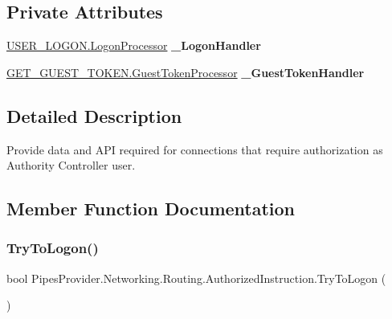 \subsection*{Private Attributes}
\begin{DoxyCompactItemize}
\item 
\mbox{\label{class_pipes_provider_1_1_networking_1_1_routing_1_1_authorized_instruction_ad4c378226e015ebdcd8390dd63d54669}} 
\mbox{\hyperlink{class_authority_controller_1_1_queries_1_1_u_s_e_r___l_o_g_o_n_1_1_logon_processor}{U\+S\+E\+R\+\_\+\+L\+O\+G\+O\+N.\+Logon\+Processor}} {\bfseries \+\_\+\+Logon\+Handler}
\item 
\mbox{\label{class_pipes_provider_1_1_networking_1_1_routing_1_1_authorized_instruction_a981488184cffd1c3f4e91e35bda055ba}} 
\mbox{\hyperlink{class_authority_controller_1_1_queries_1_1_g_e_t___g_u_e_s_t___t_o_k_e_n_1_1_guest_token_processor}{G\+E\+T\+\_\+\+G\+U\+E\+S\+T\+\_\+\+T\+O\+K\+E\+N.\+Guest\+Token\+Processor}} {\bfseries \+\_\+\+Guest\+Token\+Handler}
\end{DoxyCompactItemize}


\subsection{Detailed Description}
Provide data and A\+PI required for connections that require authorization as Authority Controller user. 



\subsection{Member Function Documentation}
\mbox{\label{class_pipes_provider_1_1_networking_1_1_routing_1_1_authorized_instruction_addf69c3fea172cc9d8199097466a052f}} 
\subsubsection{\texorpdfstring{Try\+To\+Logon()}{TryToLogon()}}
{\footnotesize\ttfamily bool Pipes\+Provider.\+Networking.\+Routing.\+Authorized\+Instruction.\+Try\+To\+Logon (\begin{DoxyParamCaption}{ }\end{DoxyParamCaption})}



